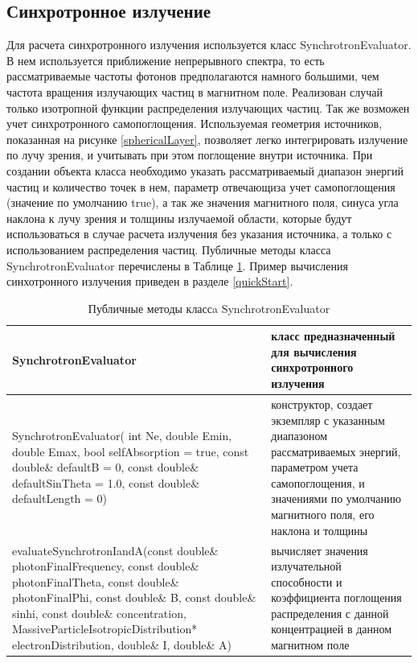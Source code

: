 \subsection{Синхротронное излучение}
Для расчета синхротронного излучения используется класс SynchrotronEvaluator. В нем используется приближение непрерывного спектра, то есть рассматриваемые частоты фотонов предполагаются намного большими, чем частота вращения излучающих частиц в магнитном поле. Реализован случай только изотропной функции распределения излучающих частиц. Так же возможен учет синхротронного самопоглощения. Используемая геометрия источников, показанная на рисунке \ref{sphericalLayer}, позволяет легко интегрировать излучение по лучу зрения, и учитывать при этом поглощение внутри источника. При создании объекта класса необходимо указать рассматриваемый диапазон энергий частиц и количество точек в нем, параметр отвечающиза учет самопоглощения (значение по умолчанию true), а так же значения магнитного поля, синуса угла наклона к лучу зрения и толщины излучаемой области, которые будут использоваться в случае расчета излучения без указания источника, а только с использованием распределения частиц. Публичные методы класса SynchrotronEvaluator перечислены в Таблице \ref{SynchrotronEvaluator}. Пример вычисления синхотронного излучения приведен в разделе \ref{quickStart}.
\begin{table}
	\begin{center}
	\begin{small}
	\caption{Публичные методы классa SynchrotronEvaluator }
	\label{SynchrotronEvaluator}
	\begin{tabularx}{\textwidth}{|X|X|} 
		\hline
		\textbf{SynchrotronEvaluator} & класс предназначенный для вычисления синхротронного излучения\\
		\hline
		SynchrotronEvaluator( int Ne, double Emin, double Emax, bool selfAbsorption = true, const double\& defaultB = 0, const double\& defaultSinTheta = 1.0, const double\& defaultLength = 0) & конструктор, создает экземпляр с указанным диапазоном рассматриваемых энергий, параметром учета самопоглощения, и значениями по умолчанию магнитного поля, его наклона и толщины\\
		\hline
		evaluateSynchrotronIandA(const double\& photonFinalFrequency, const double\& photonFinalTheta, const double\& photonFinalPhi, const double\& B, const double\& sinhi, const double\& concentration, MassiveParticleIsotropicDistribution* electronDistribution, double\& I, double\& A) & вычисляет значения излучательной способности и коэффициента поглощения распределения с данной концентрацией в данном магнитном поле\\
		\hline
	\end{tabularx}
\end{small}
\end{center}
\end{table}
